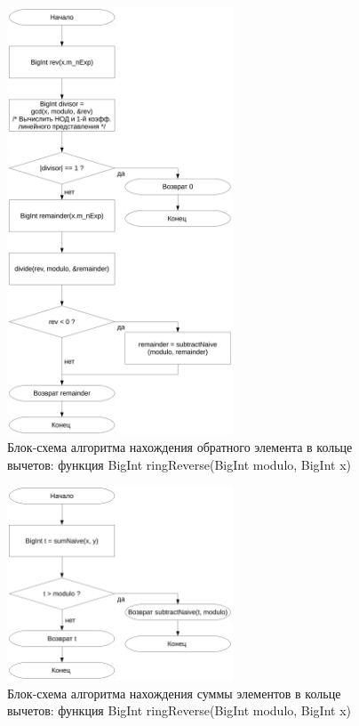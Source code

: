 \documentclass[a4paper,12pt]{article} %
\begin{document}
\begin{figure}[ht]
	\centering
	\includegraphics[width=0.6\textwidth]{lr5_ringReverse.pdf}
	\caption{
		Блок-схема алгоритма нахождения обратного элемента в кольце вычетов:
		функция BigInt ringReverse(BigInt modulo, BigInt x)
	}
\end{figure}

\begin{figure}[ht]
	\centering
	\includegraphics[width=0.6\textwidth]{lr5_sumRing.pdf}
	\caption{
		Блок-схема алгоритма нахождения суммы элементов в кольце вычетов:
		функция BigInt ringReverse(BigInt modulo, BigInt x)
	}
\end{figure}
\end{document}
